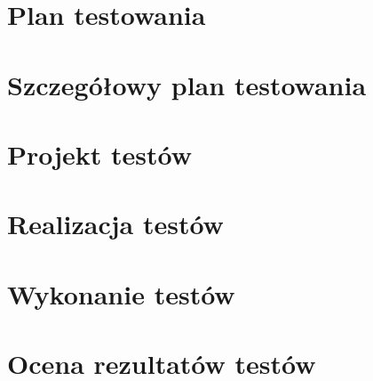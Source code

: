 \documentclass[10pt]{dokument-tiwo}
\begin{document}
\MakeDokumentMeta


\section{Plan testowania}
\label{sec:plan_ogolny}



\section{Szczegółowy plan testowania}
\label{sec:plan_szczegolowy}





\section{Projekt testów}
\label{sec:projekt}





\section{Realizacja testów}
\label{sec:realizacja}




\section{Wykonanie testów}
\label{sec:wykonanie}





\section{Ocena rezultatów testów}
\label{sec:ocena}





%


\newpage
\end{document}
